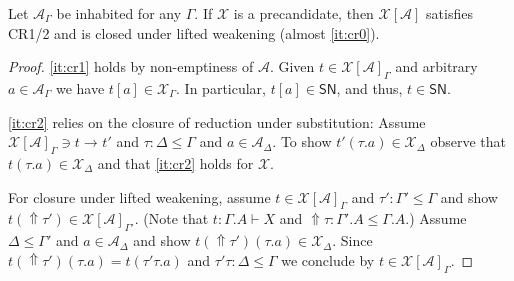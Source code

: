 \documentclass[a4paper,USenglish,cleveref, autoref, thm-restate]{lipics-v2019}
\newcommand{\red}[1][]{\longrightarrow_{#1}}
\newcommand{\A}{\mathcal{A}}
\newcommand{\X}{\mathcal{X}}
\newcommand{\SN}{\mathsf{SN}}
\newcommand{\Intro}{\mathsf{Intro}}
\newcommand{\Up}{\mathop{\Uparrow}}
\begin{document}
\begin{lemma}[Abstraction]
\label{lem:abs}
  Let $\A_\Gamma$ be inhabited for any $\Gamma$.
  If $\X$ is a precandidate, then $\X[\A]$ satisfies CR1/2 and is
  closed under lifted weakening (almost \ref{it:cr0}).
\end{lemma}
\begin{proof}
  \ref{it:cr1} holds by non-emptiness of $\A$.  Given $t \in \X[\A]_\Gamma$ and
  arbitrary $a \in \A_\Gamma$ we have $t[a] \in \X_\Gamma$.  In
  particular, $t[a] \in \SN$, and thus, $t \in \SN$.

  \ref{it:cr2} relies on the closure of reduction
  under substitution:  Assume $\X[\A]_\Gamma \ni t \red t'$ and $\tau
  : \Delta \leq \Gamma$ and $a \in \A_\Delta$.  To show $t'(\tau.a)
  \in \X_\Delta$ observe that $t(\tau.a) \in \X_\Delta$ and that \ref{it:cr2}
  holds for $\X$.

  For closure under lifted weakening, assume $t \in \X[\A]_\Gamma$ and
  $\tau' : \Gamma' \leq \Gamma$ and show $t(\Up\tau') \in \X[\A]_{\Gamma'}$.
  (Note that $t : \Gamma.A \vdash X$ and $\Up\tau : \Gamma'.A \leq
  \Gamma.A$.)
  Assume $\Delta \leq \Gamma'$ and $a \in \A_\Delta$ and show
  $t(\Up\tau')(\tau.a) \in \X_\Delta$.  Since $t(\Up\tau')(\tau.a) =
  t(\tau'\tau.a)$ and $\tau'\tau : \Delta \leq \Gamma$ we conclude by
  $t \in \X[\A]_\Gamma$.

\end{proof}
\end{document}
